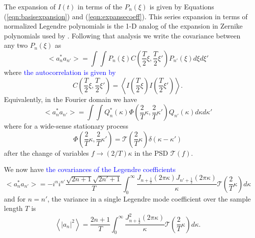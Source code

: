 \documentclass[10pt,preprint]{aastex631}
\newcommand{\jrmadd}[1]{\textcolor{blue}{#1}}
\begin{document}
The expansion of $I(t)$ in terms of the $P_n(\xi)$ is given by Equations (\ref{eqn:basisexpansion}) and (\ref{eqn:expansecoeff}).  This series expansion in terms of normalized Legendre polynomials is the 1-D analog of the expansion in Zernike polynomials used by \citet{1976JOSA...66..207N}.  Following that analysis we write the covariance between any two $P_n(\xi)$ as
\begin{equation}
<a_n^* a_{n'}> = \int \int P_n(\xi) C\left(\frac{T}{2}\xi, \frac{T}{2}\xi' \right) P_{n'}(\xi) d\xi d\xi' 
\end{equation}
where \jrmadd{the autocorrelation is given by}
\begin{equation}
C\left(\frac{T}{2}\xi, \frac{T}{2}\xi' \right) = \left<I\left(\frac{T}{2}\xi\right)I\left(\frac{T}{2}\xi'\right) \right>.
\end{equation}
Equivalently, in the Fourier domain we have
\begin{equation}
<a_n^* a_{n'}> = \int \int Q_n^*(\kappa) \Phi \left(\frac{2}{T}\kappa, \frac{2}{T}\kappa' \right) Q_{n'}(\kappa) d\kappa d\kappa' 
\end{equation}
where for a wide-sense stationary process
\begin{equation}
\Phi \left(\frac{2}{T}\kappa, \frac{2}{T}\kappa' \right) =  \mathcal{T}\left(\frac{2}{T}\kappa \right) \delta(\kappa-\kappa')
\end{equation}
after the change of variables $f \rightarrow (2/T)\kappa$ in the PSD $\mathcal{T}(f)$.

We now have \jrmadd{the covariances of the Legendre coefficients}
\begin{equation}
<a_n^* a_{n'}> = -i^n i^{n'} \frac{\sqrt{2n+1}\sqrt{2n'+1}}{T}   \int_{0}^{\infty} \frac{J_{n+\frac{1}{2}}(2\pi \kappa) J_{n'+\frac{1}{2}}(2\pi \kappa)}{\kappa} \mathcal{T}\left( \frac{2}{T} \kappa \right) d\kappa
\end{equation}
and for $n = n'$, the variance in a single Legendre mode coefficient over the sample length $T$ is
\begin{equation}
\left\langle \left|a_n\right|^2 \right\rangle = \frac{2n+1}{T}  \int_0^{\infty} \frac{ J_{n+\frac{1}{2}}^2(2\pi \kappa)}{\kappa} \mathcal{T}\left( \frac{2}{T} \kappa \right) d\kappa.
\label{eqn:varcoeff}
\end{equation}



\end{document}
